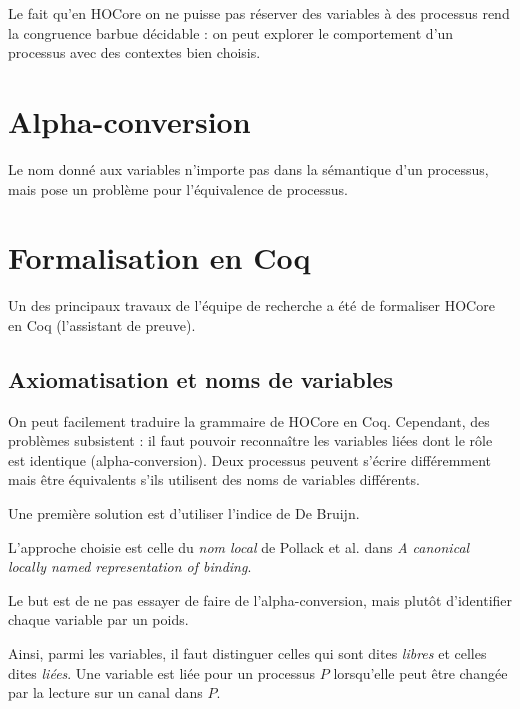 \documentclass{article}
\begin{document}
Le fait qu'en HOCore on ne puisse pas réserver des variables à des processus rend la congruence barbue décidable : on peut explorer le comportement d'un processus avec des contextes bien choisis.

\section{Alpha-conversion}
Le nom donné aux variables n'importe pas dans la sémantique d'un processus, mais pose un problème pour l'équivalence de processus.


\section{Formalisation en Coq}
Un des principaux travaux de l'équipe de recherche a été de formaliser HOCore en Coq (l'assistant de preuve).

\subsection{Axiomatisation et noms de variables}
On peut facilement traduire la grammaire de HOCore en Coq. Cependant, des problèmes subsistent : il faut pouvoir reconnaître les variables liées dont le rôle est identique (alpha-conversion). Deux processus peuvent s'écrire différemment mais être équivalents s'ils utilisent des noms de variables différents. %

Une première solution est d'utiliser l'indice de De Bruijn. %

L'approche choisie est celle du \textit{nom local} %
de Pollack et al. dans \textit{A canonical locally named representation of binding}.

Le but est de ne pas essayer de faire de l'alpha-conversion, mais plutôt d'identifier chaque variable par un poids.


Ainsi, parmi les variables, il faut distinguer celles qui sont dites \textit{libres} et celles dites \textit{liées}.
Une variable est liée pour un processus $P$ lorsqu'elle peut être changée par la lecture sur un canal dans $P$.
\end{document}
